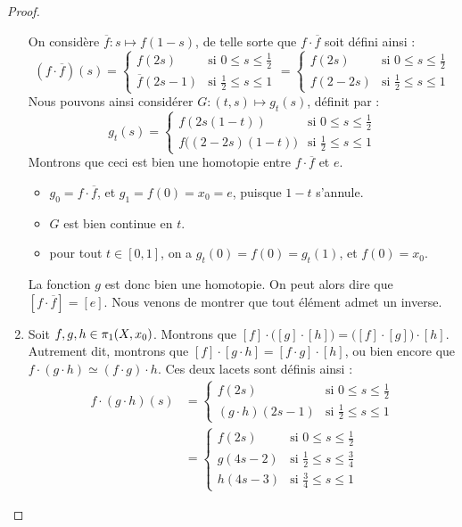 \documentclass[hidelinks, 10pt]{article}
\begin{document}
\begin{proof}
\begin{enumerate}
On considère $\overline{f}:s\mapsto f(1-s)$, de telle sorte que $f\cdot \overline{f}$ soit défini ainsi : \[(f\cdot\overline{f})(s)=\left\{\begin{matrix}
f(2s)&\text{si } 0\leq s\leq \frac{1}{2}\\ 
\overline{f}(2s-1)&\text{si }\frac{1}{2}\leq s\leq 1
\end{matrix}\right.=\left\{\begin{matrix}
f(2s)&\text{si } 0\leq s\leq \frac{1}{2}\\ 
f(2-2s)&\text{si }\frac{1}{2}\leq s\leq 1
\end{matrix}\right.\]Nous pouvons ainsi considérer $G:(t,s)\mapsto g_t(s)$, définit par : \[g_t(s)=\left\{\begin{matrix}
f(2s(1-t))&\text{si } 0\leq s\leq \frac{1}{2}\\ 
f\big((2-2s)(1-t)\big)&\text{si }\frac{1}{2}\leq s\leq 1
\end{matrix}\right.\]Montrons que ceci est bien une homotopie entre $f\cdot\overline{f}$ et $e$.\begin{itemize}
    \item $g_0=f\cdot\overline{f}$, et $g_1=f(0)=x_0=e$, puisque $1-t$ s'annule.
    \item $G$ est bien continue en $t$.
    \item pour tout $t\in[0,1]$, on a $g_t(0)=f(0)=g_t(1)$, et $f(0)=x_0$.
\end{itemize}
La fonction $g$ est donc bien une homotopie. On peut alors dire que $[f\cdot \overline{f}]=[e]$. Nous venons de montrer que tout élément admet un inverse.
\item Soit $f,g,h\in\pi_1(X,x_0)$. Montrons que $[f]\cdot\big([g]\cdot[h]\big)=\big([f]\cdot[g]\big)\cdot[h]$. Autrement dit, montrons que $[f]\cdot[g\cdot h]=[f\cdot g]\cdot[h]$, ou bien encore que $f\cdot(g\cdot h)\simeq(f\cdot g)\cdot h$. Ces deux lacets sont définis ainsi : \[\begin{split}
f\cdot(g\cdot h)(s)&=\left\{\begin{matrix}
f(2s) & \text{si }0\leq s\leq\frac{1}{2}\\ 
(g\cdot h)(2s-1) & \text{si }\frac{1}{2}\leq s\leq1
\end{matrix}\right.\\
&=\left\{\begin{matrix}
f(2s) & \text{si }0\leq s\leq\frac{1}{2}\\ 
g(4s-2) & \text{si }\frac{1}{2}\leq s\leq\frac{3}{4}\\ 
h(4s-3) & \text{si }\frac{3}{4}\leq s\leq1

\end{matrix}
\end{split}\]
\end{enumerate}
\end{proof}
\end{document}

